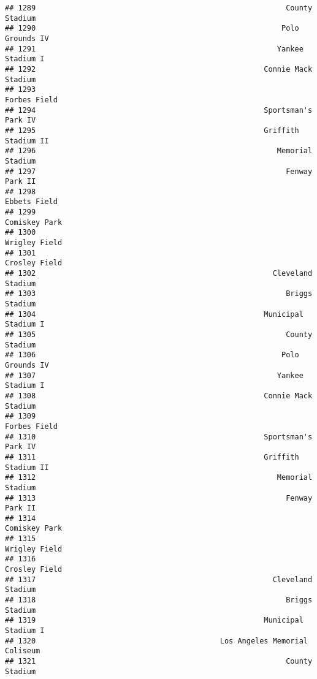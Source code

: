 \documentclass[]{article}
\begin{document}
\begin{verbatim}
## 1289                                                         County Stadium
## 1290                                                        Polo Grounds IV
## 1291                                                       Yankee Stadium I
## 1292                                                    Connie Mack Stadium
## 1293                                                           Forbes Field
## 1294                                                    Sportsman's Park IV
## 1295                                                    Griffith Stadium II
## 1296                                                       Memorial Stadium
## 1297                                                         Fenway Park II
## 1298                                                           Ebbets Field
## 1299                                                          Comiskey Park
## 1300                                                          Wrigley Field
## 1301                                                          Crosley Field
## 1302                                                      Cleveland Stadium
## 1303                                                         Briggs Stadium
## 1304                                                    Municipal Stadium I
## 1305                                                         County Stadium
## 1306                                                        Polo Grounds IV
## 1307                                                       Yankee Stadium I
## 1308                                                    Connie Mack Stadium
## 1309                                                           Forbes Field
## 1310                                                    Sportsman's Park IV
## 1311                                                    Griffith Stadium II
## 1312                                                       Memorial Stadium
## 1313                                                         Fenway Park II
## 1314                                                          Comiskey Park
## 1315                                                          Wrigley Field
## 1316                                                          Crosley Field
## 1317                                                      Cleveland Stadium
## 1318                                                         Briggs Stadium
## 1319                                                    Municipal Stadium I
## 1320                                          Los Angeles Memorial Coliseum
## 1321                                                         County Stadium

\end{verbatim}
\end{document}
